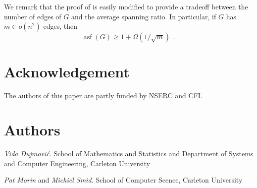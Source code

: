 \documentclass{patmorin}
\DeclareMathOperator{\asf}{asf}
\begin{document}
We remark that the proof of  is easily modified to
provide a tradeoff between the number of edges of $G$ and the average
spanning ratio.  In particular, if $G$ has $m\in o(n^2)$ edges, then
\[
   \asf(G) \ge 1 + \Omega(1/\sqrt{m}) \enspace .
\]


\section*{Acknowledgement}

The authors of this paper are partly funded by NSERC and CFI.

\section*{Authors}

\noindent\emph{Vida Dujmovi\'c.}
School of Mathematics and Statistics and Department of Systems and Computer Engineering, Carleton University

\noindent\emph{Pat Morin} and \emph{Michiel Smid.}
School of Computer Scence, Carleton University




\end{document}
